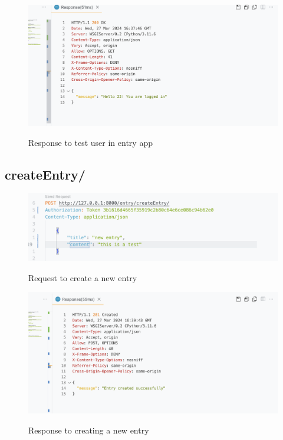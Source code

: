 \begin{figure}[H]
    \caption{Response to test user in entry app}
    \includegraphics[width=\textwidth]{Assets/api_test/response_test_user_entry.png}
    \label{fig:response_test_user_entry}
\end{figure}

\subsection{createEntry/}
\begin{figure}[H]
    \caption{Request to create a new entry}
    \includegraphics[width=\textwidth]{Assets/api_test/request_create_new_entry.png}
    \label{fig:request_create_new_entry}
\end{figure}

\begin{figure}[H]
    \caption{Response to creating a new entry}
    \includegraphics[width=\textwidth]{Assets/api_test/response_create_new_entry.png}
    \label{fig:response_create_new_entry}
\end{figure}

